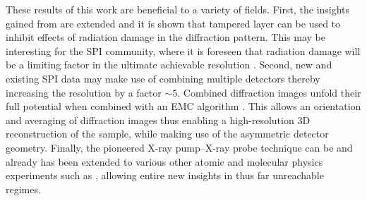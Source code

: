 %
%
These results of this work are beneficial to a variety of fields. First, the insights gained from \citep{Hoener-2008-JPB,Gorkhover-2016-NatPho} are extended and it is shown that tampered layer can be used to inhibit effects of radiation damage in the diffraction pattern. This may be interesting for the SPI community, where it is foreseen that radiation damage will be a limiting factor in the ultimate achievable resolution \citep{Aquila-2015-StrucDyn}. Second, new and existing SPI data may make use of combining multiple detectors thereby increasing the resolution by a factor $\sim 5$. Combined diffraction images unfold their full potential when combined with an EMC algorithm \citep{Loh-2009-PRE}. This allows an orientation and averaging of diffraction images thus enabling a high-resolution 3D reconstruction of the sample, while making use of the asymmetric detector geometry. Finally, the pioneered X-ray pump--X-ray probe technique can be and already has been extended to various other atomic and molecular physics experiments such as \citep{Picon-2016-NatComm,Lehmann-2016-PRA,Kimberg-2016-FD,Al-Haddad-2017-unpublished,Ferguson-2016-SciAdv}, allowing entire new insights in thus far unreachable regimes.
%
%
%